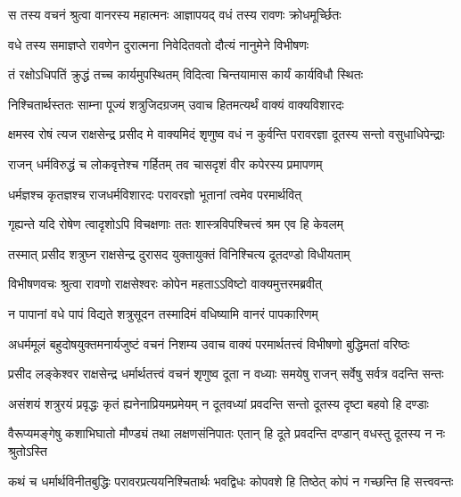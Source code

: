 
\twolineshloka
{स तस्य वचनं श्रुत्वा वानरस्य महात्मनः}
{आज्ञापयद् वधं तस्य रावणः क्रोधमूर्च्छितः} %

\twolineshloka
{वधे तस्य समाज्ञप्ते रावणेन दुरात्मना}
{निवेदितवतो दौत्यं नानुमेने विभीषणः} %

\twolineshloka
{तं रक्षोऽधिपतिं क्रुद्धं तच्च कार्यमुपस्थितम्}
{विदित्वा चिन्तयामास कार्यं कार्यविधौ स्थितः} %

\twolineshloka
{निश्चितार्थस्ततः साम्ना पूज्यं शत्रुजिदग्रजम्}
{उवाच हितमत्यर्थं वाक्यं वाक्यविशारदः} %

\twolineshloka
{क्षमस्व रोषं त्यज राक्षसेन्द्र प्रसीद मे वाक्यमिदं शृणुष्व}
{वधं न कुर्वन्ति परावरज्ञा दूतस्य सन्तो वसुधाधिपेन्द्राः} %

\twolineshloka
{राजन् धर्मविरुद्धं च लोकवृत्तेश्च गर्हितम्}
{तव चासदृशं वीर कपेरस्य प्रमापणम्} %

\twolineshloka
{धर्मज्ञश्च कृतज्ञश्च राजधर्मविशारदः}
{परावरज्ञो भूतानां त्वमेव परमार्थवित्} %

\twolineshloka
{गृह्यन्ते यदि रोषेण त्वादृशोऽपि विचक्षणाः}
{ततः शास्त्रविपश्चित्त्वं श्रम एव हि केवलम्} %

\twolineshloka
{तस्मात् प्रसीद शत्रुघ्न राक्षसेन्द्र दुरासद}
{युक्तायुक्तं विनिश्चित्य दूतदण्डो विधीयताम्} %

\twolineshloka
{विभीषणवचः श्रुत्वा रावणो राक्षसेश्वरः}
{कोपेन महताऽऽविष्टो वाक्यमुत्तरमब्रवीत्} %

\twolineshloka
{न पापानां वधे पापं विद्यते शत्रुसूदन}
{तस्मादिमं वधिष्यामि वानरं पापकारिणम्} %

\twolineshloka
{अधर्ममूलं बहुदोषयुक्तमनार्यजुष्टं वचनं निशम्य}
{उवाच वाक्यं परमार्थतत्त्वं विभीषणो बुद्धिमतां वरिष्ठः} %

\twolineshloka
{प्रसीद लङ्केश्वर राक्षसेन्द्र धर्मार्थतत्त्वं वचनं शृणुष्व}
{दूता न वध्याः समयेषु राजन् सर्वेषु सर्वत्र वदन्ति सन्तः} %

\twolineshloka
{असंशयं शत्रुरयं प्रवृद्धः कृतं ह्यनेनाप्रियमप्रमेयम्}
{न दूतवध्यां प्रवदन्ति सन्तो दूतस्य दृष्टा बहवो हि दण्डाः} %

\twolineshloka
{वैरूप्यमङ्गेषु कशाभिघातो मौण्ड्यं तथा लक्षणसंनिपातः}
{एतान् हि दूते प्रवदन्ति दण्डान् वधस्तु दूतस्य न नः श्रुतोऽस्ति} %

\twolineshloka
{कथं च धर्मार्थविनीतबुद्धिः परावरप्रत्ययनिश्चितार्थः}
{भवद्विधः कोपवशे हि तिष्ठेत् कोपं न गच्छन्ति हि सत्त्ववन्तः} %

